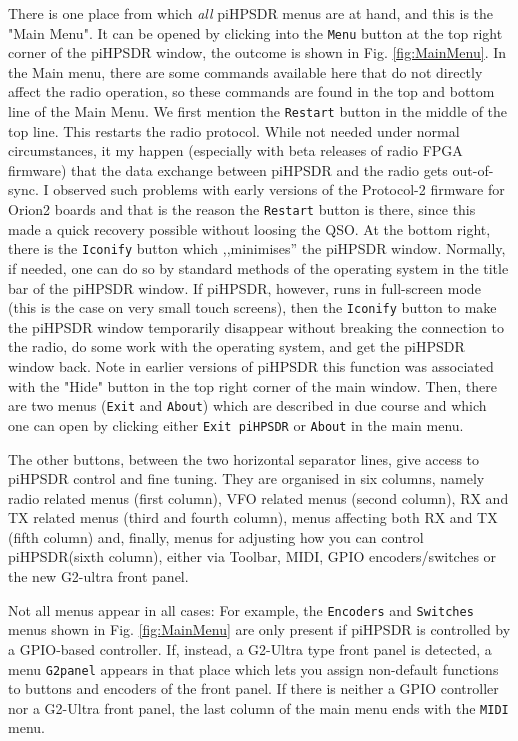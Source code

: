 \documentclass[12pt]{book}
\def\rett#1{\texttt{\color{red}#1}}
\def\bltt#1{\texttt{\color{blue}#1}}
\def\pH{pi\-HPSDR\xspace}
\begin{document}
There is one place from which \textit{all} \pH menus are at hand,
and this is the "Main Menu". It can be opened by clicking into the \rett{Menu} button at the
top right corner of the \pH window, the outcome is shown in Fig. \ref{fig:MainMenu}.
In the Main menu, there are some commands available here that do not directly affect the radio operation,
so these commands are found in the top and bottom line of the Main Menu. We first
mention the \rett{Restart} button in the middle of the top line. This restarts the
radio protocol. While not needed under normal circumstances, it my happen (especially
with beta releases of radio FPGA firmware) that the data exchange between \pH and
the radio gets out-of-sync. I observed such problems with early versions of the Protocol-2
firmware for Orion2 boards and that is the reason the \rett{Restart} button is
there, since this made a quick recovery possible without loosing the QSO.
At the bottom right, there is the \rett{Iconify} button which ,,minimises'' the
\pH window. Normally, if needed, one can do so by standard methods of the
operating system in the title bar of the \pH window. If \pH, however,
runs in full-screen mode (this is the case on very small touch screens), then the
\rett{Iconify} button to make the \pH window temporarily disappear without
breaking the connection to the radio, do some work with the operating system, and
get the \pH window back. Note in earlier versions of \pH this function was
associated with the "Hide" button in the top right corner of the main window.
Then, there are two menus (\bltt{Exit} and \bltt{About}) which are described in due course and which
one can open by clicking either \rett{Exit \pH} or \rett{About} in the main menu.

The other buttons, between the two horizontal separator lines, give access to \pH
control and fine tuning. They are organised in six columns, namely radio related
menus (first column), VFO related menus (second column), RX and TX related menus (third
and fourth column), menus affecting both RX and TX (fifth column) and, finally,
menus for adjusting how you can control \pH (sixth column), either via Toolbar,
MIDI, GPIO encoders/switches or the new G2-ultra front panel.

Not all menus appear in all cases: For example, the \bltt{Encoders} and \bltt{Switches}
menus shown in Fig. \ref{fig:MainMenu} are only present if \pH is controlled by
a GPIO-based controller. If, instead, a G2-Ultra type front panel is detected, a menu
\bltt{G2panel} appears in that place which lets you assign non-default functions to
buttons and encoders of the front panel. If there is neither a GPIO controller nor
a G2-Ultra front panel, the last column of the main menu ends with the \bltt{MIDI}
menu.
\end{document}
